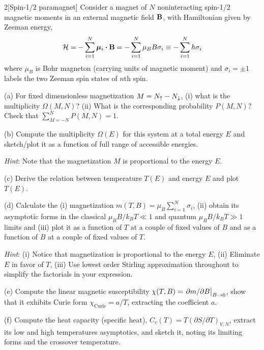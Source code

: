 \documentclass[12pt]{article}
\begin{document}
\begin{problem}{2}[Spin-1/2 paramagnet]
Consider a magnet of $N$ noninteracting spin-1/2 magnetic moments in an external
magnetic field $\vb{B}$, with Hamiltonian given by Zeeman energy,
\begin{equation}
    \HH=-\sum_{i=1}^N\bm\mu_i\vdot\vb{B}=-\sum_{i=1}^N\mu_BB\sigma_i
    \equiv-\sum_{i=1}^Nh\sigma_i
\end{equation}
where $\mu_B$ is Bohr magneton (carrying units of magnetic moment) and
$\sigma_i=\pm1$ labels the two Zeeman spin states of $n$th spin.

(a) For fixed dimensionless magnetization $M=N_\uparrow-N_\downarrow$, (i) what is the
multiplicity $\Omega(M,N)$? (ii) What is the corresponding probability $P(M,N)$?
Check that $\sum_{M=-N}^NP(M,N)=1$.

(b) Compute the multiplicity $\Omega(E)$ for this system at a total energy $E$
and sketch/plot it as a function of full range of accessible energies. 

\textit{Hint}: Note that the magnetization $M$ is proportional to the energy
$E$.

(c) Derive the relation between temperature $T(E)$ and energy $E$ and plot
$T(E)$.

(d) Calculate the (i) magnetization $m(T,B)=\mu_B\sum_{i=1}^N\sigma_i$, (ii)
obtain its asymptotic forms in the classical $\mu_BB/k_BT\ll 1$ and quantum
$\mu_BB/k_BT\gg 1$ limits and (iii) plot it as a function of $T$ at a couple of
fixed values of $B$ and as a function of $B$ at a couple of fixed values of $T$.

\textit{Hint}: (i) Notice that magnetization is proportional to the energy $E$,
(ii) Eliminate $E$ in favor of $T$, (iii) Use lowest order Stirling
approximation throughout to simplify the factorials in your expression.

(e) Compute the linear magnetic susceptibility $\chi(T,B)=\eval{\partial
m/\partial B}_{B\to0}$, show that it exhibits Curie form
$\chi_\text{Curie}=a/T$, extracting the coefficient $a$.

(f) Compute the heat capacity (specific heat), $C_v(T)=T(\partial S/\partial
T)_{V,N}$, extract its low and high temperatures asymptotics, and sketch it,
noting its limiting forms and the crossover temperature.
\begin{solution}
\end{solution}
\end{problem}
\end{document}
